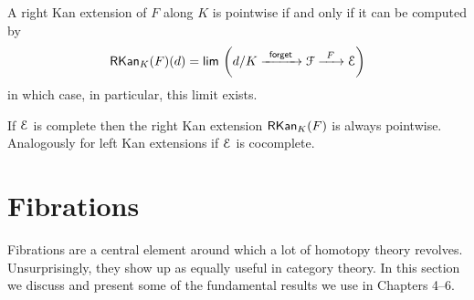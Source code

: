 \documentclass{amsbook}
\begin{document}
\begin{theorem}\label{ap:: thm: right Kan extension pointwise}
    A right Kan extension of $F$ along $K$ is pointwise if and only if it can be computed by 
    \begin{equation}
        \rkan_{K}(F)(d) = \Limit[\phantom{.}]\bigg(d/K \xra{\mathsf{\,\,\,forget\,\,\,}} \cF \xra{\,\,\, F\,\,\,} \cE \bigg)
    \end{equation} 
    in which case, in particular, this limit exists.
\end{theorem}

\begin{observation}
    If $\mathcal E$ is complete then the right Kan extension $\operatorname{{\sf RKan}}_{K}(F)$ is always pointwise. Analogously for left Kan extensions if $\mathcal E$ is cocomplete.
\end{observation}



\section{Fibrations}

Fibrations are a central element around which a lot of homotopy theory revolves. Unsurprisingly, they show up as equally useful in category theory. In this section we discuss and present some of the fundamental results we use in Chapters 4--6.
\end{document}
